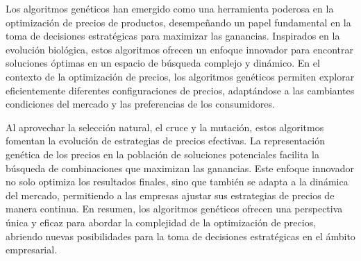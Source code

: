 Los algoritmos genéticos han emergido como una herramienta poderosa en la optimización de precios de productos, desempeñando un papel fundamental en la toma de decisiones estratégicas para maximizar las ganancias. Inspirados en la evolución biológica, estos algoritmos ofrecen un enfoque innovador para encontrar soluciones óptimas en un espacio de búsqueda complejo y dinámico. En el contexto de la optimización de precios, los algoritmos genéticos permiten explorar eficientemente diferentes configuraciones de precios, adaptándose a las cambiantes condiciones del mercado y las preferencias de los consumidores.

Al aprovechar la selección natural, el cruce y la mutación, estos algoritmos fomentan la evolución de estrategias de precios efectivas. La representación genética de los precios en la población de soluciones potenciales facilita la búsqueda de combinaciones que maximizan las ganancias. Este enfoque innovador no solo optimiza los resultados finales, sino que también se adapta a la dinámica del mercado, permitiendo a las empresas ajustar sus estrategias de precios de manera continua. En resumen, los algoritmos genéticos ofrecen una perspectiva única y eficaz para abordar la complejidad de la optimización de precios, abriendo nuevas posibilidades para la toma de decisiones estratégicas en el ámbito empresarial.
